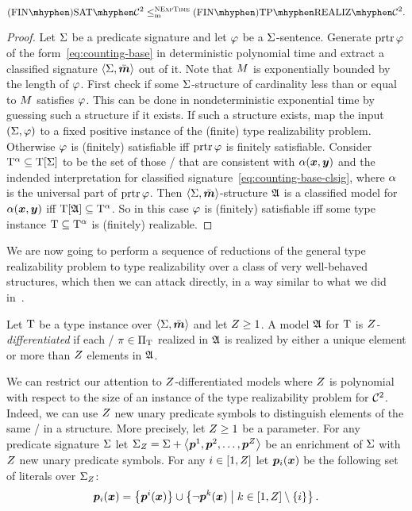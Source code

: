 \begin{remark}
\[
\FinASat{\vFoc2} \red\cNExpTime \FinAReal{\vFoc2}.
\]
\end{remark}
\begin{proof}
Let $\mathrm{\Sigma}$ be a predicate signature and let $\varphi$ be a $\mathrm{\Sigma}$-sentence.
Generate $\operatorname{prtr}\varphi$ of the form~\cref{eq:counting-base} in deterministic
polynomial time and extract a classified signature $\left\langle \mathrm{\Sigma},\bar{\bm{m}} \right\rangle$ out of it.
Note that $M$ is exponentially bounded by the length of $\varphi$.
First check if some $\mathrm{\Sigma}$-structure of cardinality less than or equal to $M$
satisfies $\varphi$. This can be done in nondeterministic exponential time by
guessing such a structure if it exists.
If such a structure exists, map the input $(\mathrm{\Sigma},\varphi)$ to a fixed positive
instance of the (finite) type realizability problem.
Otherwise $\varphi$ is (finitely) satisfiable iff $\operatorname{prtr}\varphi$ is finitely
satisfiable.
Consider $\mathrm{T}^\alpha \subseteq \mathrm{T}[\mathrm{\Sigma}]$ to be the set of those \twotypes/ that
are consistent with $\alpha(\bm{x},\bm{y})$ and the indended interpretation for
classified signature~\cref{eq:counting-base-clsig}, where $\alpha$ is the
universal part of $\operatorname{prtr}\varphi$.
Then $\left\langle \mathrm{\Sigma},\bar{\bm{m}} \right\rangle$-structure $\mathfrak{A}$ is a classified model for
$\alpha(\bm{x},\bm{y})$ iff $\mathrm{T}[\mathfrak{A}] \subseteq \mathrm{T}^\alpha$.
So in this case $\varphi$ is (finitely) satisfiable iff some
type instance $\mathrm{T}\subseteq\mathrm{T}^\alpha$ is (finitely) realizable.
\end{proof}
We are now going to perform a sequence of reductions of the general type
realizability problem to type realizability over a class of very well-behaved
structures, which then we can attack directly, in a way similar to what we did
in~.
\begin{definition}
Let $\mathrm{T}$ be a type instance over $\left\langle \mathrm{\Sigma},\bar{\bm{m}} \right\rangle$ and let $Z\geq1$.
A model $\mathfrak{A}$ for $\mathrm{T}$ is \emph{$Z$-differentiated}
if each \onetype/ $\pi\in{\Pi}_{\mathrm{T}}$ realized in $\mathfrak{A}$ is realized by either a
unique element or more than $Z$ elements in $\mathfrak{A}$.
\end{definition}
We can restrict our attention to $Z$-differentiated models where $Z$ is
polynomial with respect to the size of an instance of the type realizability
problem for $\mathcal{C}^{2}$.
Indeed, we can use $Z$ new unary predicate symbols to distinguish elements of
the same \onetype/ in a structure.
More precisely, let $Z\geq1$ be a parameter.
For any predicate signature $\mathrm{\Sigma}$
let ${\mathrm{\Sigma}}_{Z} = \mathrm{\Sigma} + \left\langle \bm{p}^{1},\bm{p}^{2},\dots,\bm{p}^{Z} \right\rangle$ be an enrichment of
$\mathrm{\Sigma}$ with $Z$ new unary predicate symbols.
For any $i\in[1,Z]$ let $\bm{p}_{i}(\bm{x})$ be the following set of literals over
${\mathrm{\Sigma}}_{Z}$:
\[
\bm{p}_{i}(\bm{x}) =
\left\{\bm{p}^{i}(\bm{x})\right\}\cup\left\{\lnot\bm{p}^{k}(\bm{x})\mathrel{}\middle|\mathrel{}k\in[1,Z]\setminus\left\{i\right\}\right\}.
\]

